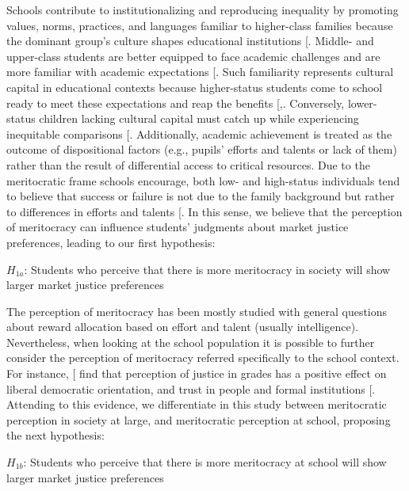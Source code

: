 \documentclass[
  12pt,
  letterpaper,
]{article}
\begin{document}
Schools contribute to institutionalizing and reproducing inequality by
promoting values, norms, practices, and languages familiar to
higher-class families because the dominant group's culture shapes
educational institutions
{[}\citeproc{ref-bourdieu_reproduction_1990}{1}{]}. Middle- and
upper-class students are better equipped to face academic challenges and
are more familiar with academic expectations
{[}\citeproc{ref-mikus_children_2019}{59}{]}. Such familiarity
represents cultural capital in educational contexts because
higher-status students come to school ready to meet these expectations
and reap the benefits
{[},\citeproc{ref-khan_privilege_2011}{61}{]}.
Conversely, lower-status children lacking cultural capital must catch up
while experiencing inequitable comparisons
{[}\citeproc{ref-goudeau_hidden_2017}{62}{]}. Additionally, academic
achievement is treated as the outcome of dispositional factors (e.g.,
pupils' efforts and talents or lack of them) rather than the result of
differential access to critical resources. Due to the meritocratic frame
schools encourage, both low- and high-status individuals tend to believe
that success or failure is not due to the family background but rather
to differences in efforts and talents
{[}\citeproc{ref-darnon_where_2018}{63}{]}. In this sense, we believe
that the perception of meritocracy can influence students' judgments
about market justice preferences, leading to our first hypothesis:

\(H_{1a}\): Students who perceive that there is more meritocracy in
society will show larger market justice preferences

The perception of meritocracy has been mostly studied with general
questions about reward allocation based on effort and talent (usually
intelligence). Nevertheless, when looking at the school population it is
possible to further consider the perception of meritocracy referred
specifically to the school context. For instance,
{[}\citeproc{ref-resh_sense_2010}{64}{]} find that perception of justice
in grades has a positive effect on liberal democratic orientation, and
trust in people and formal institutions
{[}\citeproc{ref-resh_sense_2014}{65}{]}. Attending to this evidence, we
differentiate in this study between meritocratic perception in society
at large, and meritocratic perception at school, proposing the next
hypothesis:

\(H_{1b}\): Students who perceive that there is more meritocracy at
school will show larger market justice preferences
\end{document}
